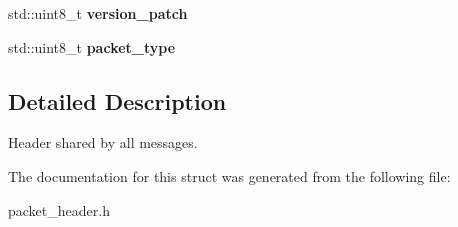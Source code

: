 \begin{DoxyCompactItemize}
\item 
\hypertarget{structquanergy_1_1client_1_1PacketHeader_a64f138d48e9fcb2a9f03947cbb40e3f3}{std\-::uint8\-\_\-t {\bfseries version\-\_\-patch}}\label{structquanergy_1_1client_1_1PacketHeader_a64f138d48e9fcb2a9f03947cbb40e3f3}

\item 
\hypertarget{structquanergy_1_1client_1_1PacketHeader_aed77a534a21367441435c794c6adb868}{std\-::uint8\-\_\-t {\bfseries packet\-\_\-type}}\label{structquanergy_1_1client_1_1PacketHeader_aed77a534a21367441435c794c6adb868}

\end{DoxyCompactItemize}


\subsection{Detailed Description}
Header shared by all messages. 

The documentation for this struct was generated from the following file\-:\begin{DoxyCompactItemize}
\item 
packet\-\_\-header.\-h\end{DoxyCompactItemize}
